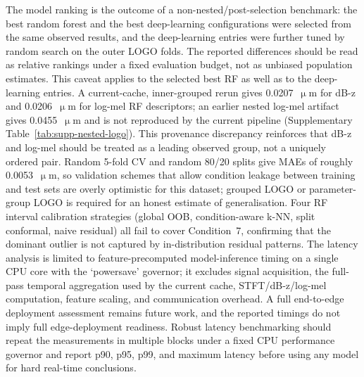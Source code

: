 The model ranking is the outcome of a non-nested/post-selection benchmark:
the best random forest and the best deep-learning configurations were
selected from the same observed results, and the deep-learning entries
were further tuned by random search on the outer LOGO folds. The reported
differences should be read as relative rankings under a fixed evaluation
budget, not as unbiased population estimates. This caveat applies to the
selected best RF as well as to the deep-learning entries. A current-cache,
inner-grouped rerun gives 0.0207~\(\upmu\)m for dB-z and 0.0206~\(\upmu\)m
for log-mel RF descriptors; an earlier nested log-mel artifact gives
0.0455~\(\upmu\)m and is not reproduced by the current pipeline
(Supplementary Table~\ref{tab:supp-nested-logo}). This provenance discrepancy
reinforces that dB-z and log-mel should be treated as a leading observed group,
not a uniquely ordered pair. Random 5-fold CV and
random 80/20 splits give MAEs of roughly 0.0053~\(\upmu\)m, so validation
schemes that allow condition leakage between training and test sets are
overly optimistic for this dataset; grouped LOGO or parameter-group LOGO
is required for an honest estimate of generalisation. Four RF interval
calibration strategies (global OOB, condition-aware k-NN, split
conformal, naive residual) all fail to cover Condition~7, confirming that
the dominant outlier is not captured by in-distribution residual
patterns. The latency analysis is limited to feature-precomputed
model-inference timing on a single CPU core with the `powersave'
governor; it excludes signal acquisition, the full-pass temporal aggregation used by the current cache, STFT/dB-z/log-mel computation, feature scaling, and communication
	overhead. A full end-to-edge deployment assessment remains future work, and
	the reported timings do not imply full edge-deployment readiness. Robust
	latency benchmarking should repeat the measurements in multiple blocks
	under a fixed CPU performance governor and report p90, p95, p99, and
	maximum latency before using any model for hard real-time conclusions.
